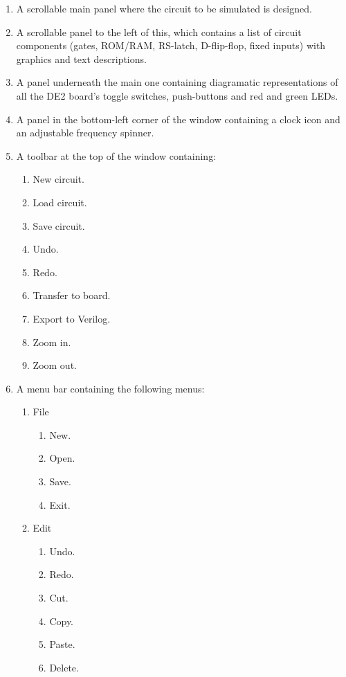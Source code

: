 \documentclass[12pt, a4paper, oneside,titlepage]{article}
\begin{document}
\begin{enumerate}
\item A scrollable main panel where the circuit to be simulated is designed.
\item A scrollable panel to the left of this, which contains a list of circuit components (gates, ROM/RAM, RS-latch, D-flip-flop, fixed inputs) with graphics and text descriptions.
\item A panel underneath the main one containing diagramatic representations of all the DE2 board's toggle switches, push-buttons and red and green LEDs.
\item A panel in the bottom-left corner of the window containing a clock icon and an adjustable frequency spinner.
\item A toolbar at the top of the window containing: \begin{enumerate}
												\item New circuit.
												\item Load circuit.
												\item Save circuit.
												\item Undo.
												\item Redo.
												\item Transfer to board.
												\item Export to Verilog.
												\item Zoom in.
												\item Zoom out.
												\end{enumerate}
												
\item A menu bar containing the following menus: \begin{enumerate}
												\item File
												\begin{enumerate}
												\item New.
												\item Open.
												\item Save.
												\item Exit.
												\end{enumerate}																											\item Edit
																								\begin{enumerate}
												\item Undo.
												\item Redo.
												\item Cut.
												\item Copy.
												\item Paste.
												\item Delete.
												\end{enumerate}		
												

\end{enumerate}
\end{enumerate}
\end{document}
